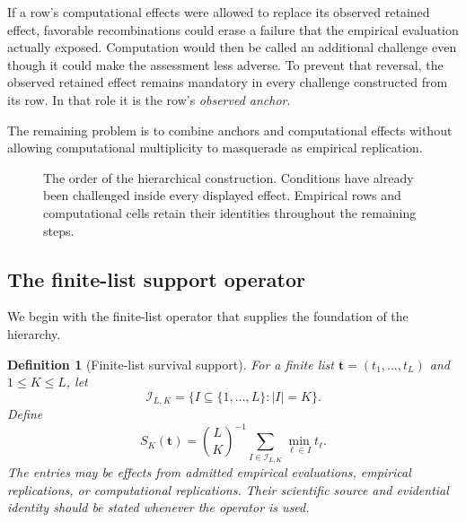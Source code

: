 \documentclass[11pt]{article}
\newtheorem{definition}{Definition}
\theoremstyle{remark}
\begin{document}
If a row's computational effects were allowed to replace its observed retained
effect, favorable recombinations could erase a failure that the empirical
evaluation actually exposed. Computation would then be called an additional
challenge even though it could make the assessment less adverse. To prevent
that reversal, the observed retained effect remains mandatory in every
challenge constructed from its row. In that role it is the row's
\emph{observed anchor}.

The remaining problem is to combine anchors and computational effects without
allowing computational multiplicity to masquerade as empirical replication.

\begin{figure}[htbp]
\centering
{}
\caption{The order of the hierarchical construction. Conditions have already
been challenged inside every displayed effect. Empirical rows and
computational cells retain their identities throughout the remaining steps.}
\label{fig:hierarchy-schematic}
\end{figure}

\subsection{The finite-list support operator}

We begin with the finite-list operator that supplies the foundation of the
hierarchy.

\begin{definition}[Finite-list survival support]
\label{def:support}
For a finite list $\mathbf t=(t_1,\ldots,t_L)$ and $1\leq K\leq L$, let
\[
\mathcal I_{L,K}
=
\{I\subseteq\{1,\ldots,L\}:|I|=K\}.
\]
Define
\begin{equation}
S_K(\mathbf t)
=
\binom{L}{K}^{-1}
\sum_{I\in\mathcal I_{L,K}}
\min_{\ell\in I}t_\ell.
\label{eq:finite-list-support}
\end{equation}
The entries may be effects from admitted empirical evaluations, empirical
replications, or computational replications. Their scientific source and
evidential identity should be stated whenever the operator is used.
\end{definition}
\end{document}
